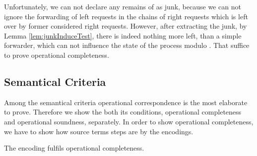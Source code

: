 \documentclass[]{llncs}
\begin{document}
Unfortunately, we can not declare any remains of \simulations as junk, because we can not ignore the forwarding of left requests in the chains of right requests which is left over by former considered right requests. However, after extracting the junk, by Lemma \ref{lem:junkInduceTest}, there is indeed nothing more left, than a simple forwarder, which can not influence the state of the process modulo . That suffice to prove operational completeness.

\subsection{Semantical Criteria}

Among the semantical criteria operational correspondence is the most elaborate to prove. Therefore we show the both its conditions, operational completeness and operational soundness, separately. In order to show operational completeness, we have to show how source terms steps are \simulated by the encodings.

\begin{lemma} \label{lem:operationalCompletenessSepAsyn}
	The encoding  fulfils operational completeness.
\end{lemma}
\end{document}
